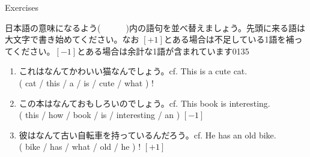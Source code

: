 \documentclass[aspectratio=169,xcolor={dvipsnames,table}]{beamer}
\begin{document}
\begin{frame}[plain]{Exercises}

{\small 日本語の意味になるよう(~~~~~~)内の語句を並べ替えましょう。先頭に来る語は大文字で書き始めてください。なお $[ +1 ]$とある場合は不足している1語を補ってください。$[ -1 ]$とある場合は余計な1語が含まれています}\hfill{\tiny 0135}\,{\scriptsize {}}
 \
 \begin{enumerate}
  \item これはなんてかわいい猫なんでしょう。\hfill{\scriptsize cf. This is a cute cat.}\\
	( cat / this / a / is / cute / what ) !\\
  \item この本はなんておもしろいのでしょう。\hfill{\scriptsize cf. This book is interesting.}\\
	( this / how / book / is / interesting / an ) $[ -1 ]$\\
  \item 彼はなんて古い自転車を持っているんだろう。\hfill{\scriptsize cf. He has an old bike.}\\
	( bike / has / what / old / he ) ! $[ +1 ]$\\
 \end{enumerate}
\end{frame}
\end{document}
